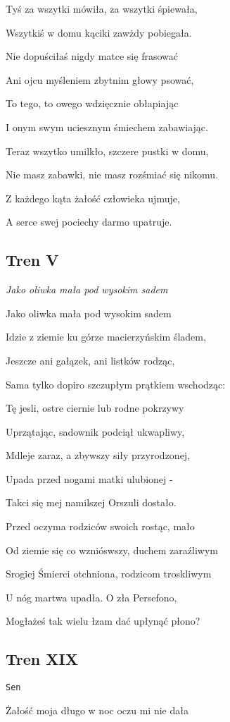 \documentclass{article}
\begin{document}
Tyś za wszytki mówiła, za wszytki śpiewała,

Wszytkiś w domu kąciki zawżdy pobiegała.

Nie dopuściłaś nigdy matce się frasować

Ani ojcu myśleniem zbytnim głowy psować,

To tego, to owego wdzięcznie obłapiając

I onym swym uciesznym śmiechem zabawiając.

Teraz wszytko umilkło, szczere pustki w domu,

Nie masz zabawki, nie masz rozśmiać się nikomu.

Z każdego kąta żałość człowieka ujmuje,

A serce swej pociechy darmo upatruje.

\subsection{Tren V}

\textit{Jako oliwka mała pod wysokim sadem}

Jako oliwka mała pod wysokim sadem

Idzie z ziemie ku górze macierzyńskim śladem,

Jeszcze ani gałązek, ani listków rodząc,

Sama tylko dopiro szczupłym prątkiem wschodząc:

Tę jesli, ostre ciernie lub rodne pokrzywy

Uprzątając, sadownik podciął ukwapliwy,

Mdleje zaraz, a zbywszy siły przyrodzonej,

Upada przed nogami matki ulubionej -

Takci się mej namilszej Orszuli dostało.

Przed oczyma rodziców swoich rostąc, mało

Od ziemie się co wznióswszy, duchem zaraźliwym

Srogiej Śmierci otchniona, rodzicom troskliwym

U nóg martwa upadła. O zła Persefono,

Mogłażeś tak wielu łzam dać upłynąć płono?

\subsection{Tren XIX}

\texttt{Sen}

Żałość moja długo w noc oczu mi nie dała
\end{document}
